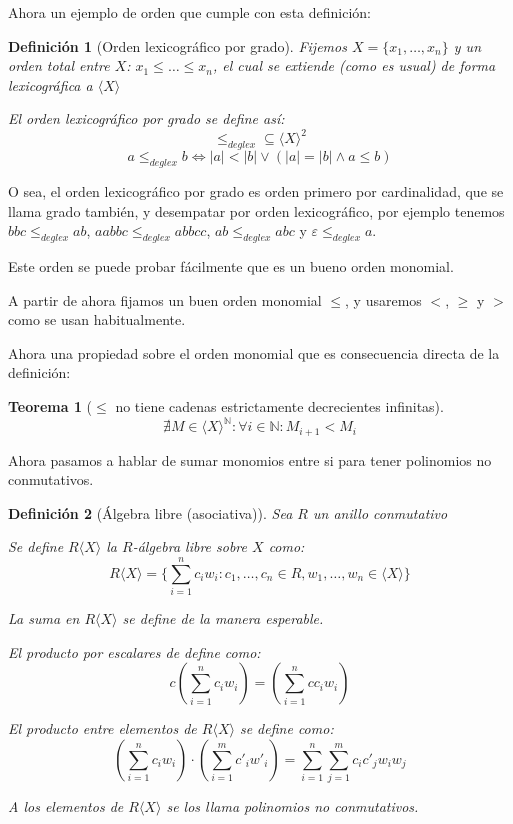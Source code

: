 \documentclass[fleqn]{amsbook} %
\theoremstyle{customstyle}
\newtheorem{definition}{Definición}[section]
\newtheorem{theorem}{Teorema}[section]
\begin{document}
Ahora un ejemplo de orden que cumple con esta definición:

\begin{definition}[Orden lexicográfico por grado]
Fijemos $X = \{x_1, …, x_n\}$ y un orden total entre $X$: $x_1 ≤ … ≤ x_n$, el cual se extiende (como es usual) de forma lexicográfica a $⟨X⟩$

El orden lexicográfico por grado se define así:
\[ ≤_{deglex} ⊆ ⟨X⟩^2 \]
\[ a ≤_{deglex} b ⇔ |a| < |b| ∨ (|a| = |b| ∧ a ≤ b) \]
\end{definition}

O sea, el orden lexicográfico por grado es orden primero por cardinalidad, que se llama grado también, y desempatar por orden lexicográfico, por ejemplo tenemos $bbc ≤_{deglex} ab$, $aabbc ≤_{deglex} abbcc$, $ab ≤_{deglex} abc$ y $ε ≤_{deglex} a$.

Este orden se puede probar fácilmente que es un bueno orden monomial.

A partir de ahora fijamos un buen orden monomial $≤$, y usaremos $<$, $≥$ y $>$ como se usan habitualmente.

Ahora una propiedad sobre el orden monomial que es consecuencia directa de la definición:

\begin{theorem}[$≤$ no tiene cadenas estrictamente decrecientes infinitas]\label{thm:< no cadenas dec inf}
\[ ∄M ∈ ⟨X⟩^ℕ : ∀i ∈ ℕ : M_{i + 1} < M_i \]
\end{theorem}

Ahora pasamos a hablar de sumar monomios entre si para tener polinomios no conmutativos.

\begin{definition}[Álgebra libre (asociativa)]
Sea $R$ un anillo conmutativo

Se define $R⟨X⟩$ la $R$-álgebra libre sobre $X$ como:
\[ R⟨X⟩ = \{∑_{i = 1}^n c_i w_i : c_1, …, c_n ∈ R, w_1, …, w_n ∈ ⟨X⟩\} \]

La suma en $R⟨X⟩$ se define de la manera esperable.

El producto por escalares de define como:
\[ c (∑_{i = 1}^n c_i w_i) = (∑_{i = 1}^n c c_i w_i) \]

El producto entre elementos de $R⟨X⟩$ se define como:
\[ (∑_{i = 1}^n c_i w_i) · (∑_{i = 1}^m c'_i w'_i) = ∑_{i = 1}^n ∑_{j = 1}^m c_i c'_j w_i w_j \]

A los elementos de $R⟨X⟩$ se los llama polinomios no conmutativos.
\end{definition}
\end{document}
